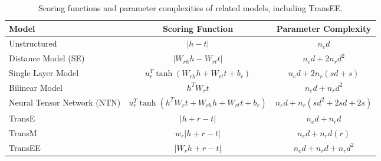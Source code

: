\documentclass[11pt]{article}
\begin{document}
\FloatBarrier

\begin{table*}[t]
\centering
\begin{tabular}{|l|c|c|}
\hline
\textbf{Model} & \textbf{Scoring Function} & \textbf{Parameter Complexity} \\ \hline
Unstructured & $|h - t|$ & $n_e d$ \\ \hline
Distance Model (SE) & $|W_{rh} h - W_{rt} t|$ & $n_e d + 2 n_r d^2$ \\ \hline
Single Layer Model & $u_r^T \tanh(W_{rh} h + W_{rt} t + b_r)$ & $n_e d + 2 n_r (s d + s)$ \\ \hline
Bilinear Model & $h^T W_r t$ & $n_e d + n_r d^2$ \\ \hline
Neural Tensor Network (NTN) & $u_r^T \tanh(h^T W_r t + W_{rh} h + W_{rt} t + b_r)$ & $n_e d + n_r (s d^2 + 2 s d + 2 s)$ \\ \hline
TransE & $|h + r - t|$ & $n_e d + n_r d$ \\ \hline
TransM & $w_r |h + r - t|$ & $n_e d + n_r d (r)$ \\ \hline
TransEE & $|W_r h + r - t|$ & $n_e d + n_r d + n_r d^2$ \\ \hline
\end{tabular}
\caption{Scoring functions and parameter complexities of related models, including TransEE.}
\label{tab:scoring_functions}
\end{table*}


\end{document}
